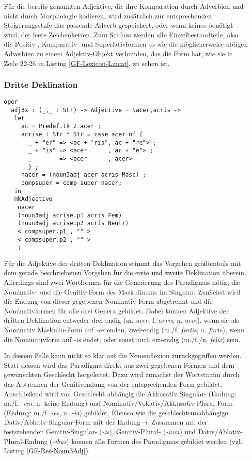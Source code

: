 Für die bereits genannten Adjektive, die ihre Komparation durch Adverbien und nicht durch Morphologie kodieren, wird zusätzlich zur entsprechenden Steigerungsstufe das passende Adverb gespeichert, oder wenn keines benötigt wird, der leere Zeichenketten. 
Zum Schluss werden alle Einzelbestandteile, also die Positiv-, Komparativ- und Superlativformen so wie die möglicherweise nötigen Adverbien zu einem Adjektiv-Objekt verbunden, das die Form hat, wie sie in Zeile 22-26 in Listing \ref{GF-Lexicon-Lincat}, zu sehen ist.\par
\FloatBarrier
\subsubsection{Dritte Deklination}
\begin{lstlisting}[float=h!tp,caption={Deklinationsfunktion für zwei- und drei-endige Adjektive der dritten Deklination (vgl. \textbf{MorphoLat.gf})},label={GF-Morpho-Adj3x},basicstyle=\small]
oper
  adj3x : (_,_ : Str) -> Adjective = \acer,acris ->
   let
     ac = Predef.tk 2 acer ;
     acrise : Str * Str = case acer of {
       _ + "er" => <ac + "ris", ac + "re"> ; 
       _ + "is" => <acer      , ac + "e"> ;
       _        => <acer      , acer> 
       } ;
     nacer = (noun3adj acer acris Masc) ;
     compsuper = comp_super nacer;
   in
   mkAdjective 
    nacer
    (noun3adj acrise.p1 acris Fem) 
    (noun3adj acrise.p2 acris Neutr) 
    < compsuper.p1 , "" >
    < compsuper.p2 , "" >
    ;
\end{lstlisting}
Für die Adjektive der dritten Deklination stimmt das Vorgehen größtenteils mit dem gerade beschriebenen Vorgehen für die erste und zweite Deklination überein. Allerdings sind zwei Wortformen für die Generierung des Paradigmas nötig, die Nominativ- und die Genitiv-Form des Maskulinums im Singular. Zunächst wird die Endung von dieser gegebenen Nominativ-Form abgetrennt und die Nominativformen für alle drei Genera gebildet. Dabei können Adjektive der dritten Deklination entweder drei-endig (m. \textit{acer}, f. \textit{acris}, n. \textit{acre}), wenn sie als Nominativ Maskulin-Form auf \textit{-er} enden, zwei-endig (m./f. \textit{fortis}, n. \textit{forte}), wenn die Nominativform auf \textit{-is} endet, oder sonst auch ein-endig (m./f./n. \textit{felix}) sein. \par
In diesem Falle kann nicht so klar auf die Nomenflexion zurückgegriffen werden. Statt dessen wird das Paradigma direkt aus zwei gegebenen Formen und dem gewünschten Geschlecht hergeleitet. Dazu wird zunächst der Wortstamm durch das Abtrennen der Genitivendung von der entsprechenden Form gebildet. Anschließend wird von Geschlecht abhängig die Akkusativ Singular- (Endung: m./f. \textit{-em}, n. keine Endung) und Nominativ/Vokativ/Akkusativ-Plural-Form (Endung: m./f. \textit{-es}, n. \textit{-ia}) gebildet. Ebenso wie die geschlechtsunabhängige Dativ/Ablativ-Singular-Form mit der Endung \textit{-i}. Zusammen mit der feststehenden Genitiv-Singular- (\textit{-is}), Genitiv-Plural- (\textit{-ium}) und Dativ/Ablativ-Plural-Endung (\textit{-ibus}) können alle Formen des Paradigmas gebildet werden (vgl. Listing \ref{GF-Res-Noun3Adj}).\par
